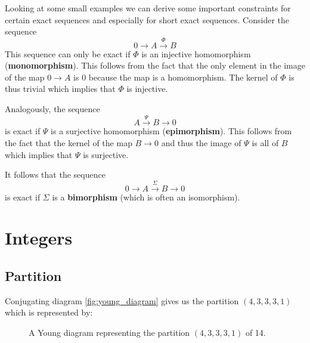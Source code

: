 	\begin{property}
		Looking at some small examples we can derive some important constraints for certain exact sequences and especially for short exact sequences. Consider the sequence
		\[
			0\rightarrow A\xrightarrow{\Phi} B
		\]
		This sequence can only be exact if $\Phi$ is an injective homomorphism (\textbf{monomorphism}). This follows from the fact that the only element in the image of the map $0\rightarrow A$ is 0 because the map is a homomorphism. The kernel of $\Phi$ is thus trivial which implies that $\Phi$ is injective.
		
		Analogously, the sequence
		\[
			A\xrightarrow{\Psi}B\rightarrow0
		\]
		is exact if $\Psi$ is a surjective homomorphism (\textbf{epimorphism}). This follows from the fact that the kernel of the map $B\rightarrow0$ and thus the image of $\Psi$ is all of $B$ which implies that $\Psi$ is surjective.
		
		It follows that the sequence
		\[
			0\rightarrow A\xrightarrow{\Sigma}B\rightarrow0
		\]
		is exact if $\Sigma$ is a \textbf{bimorphism} (which is often an isomorphism).
	\end{property}

\section{Integers}
\subsection{Partition}
	
	\begin{example}
		Conjugating diagram \ref{fig:young_diagram} gives us the partition $(4, 3, 3, 3, 1)$ which is represented by:
		\begin{figure}[!ht]
			\centering
			\caption{A Young diagram representing the partition $(4, 3, 3, 3, 1)$ of 14.}
			\label{fig:young_diagram_conj}
		\end{figure}
	\end{example}
	
